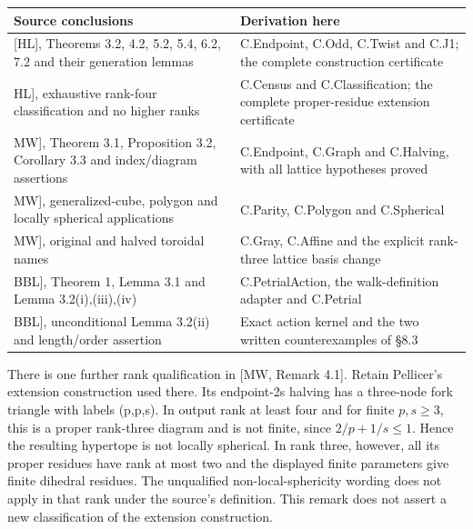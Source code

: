 \documentclass[
  11pt,
  a4paper,
]{article}
\newcounter{none} %
\begin{document}
{\def\LTcaptype{none} %
\begin{longtable}[]{@{}
  >{\raggedright\arraybackslash}p{}
  >{\raggedright\arraybackslash}p{}@{}}
\toprule\noalign{}
\begin{minipage}[b]{\linewidth}\raggedright
Source conclusions
\end{minipage} & \begin{minipage}[b]{\linewidth}\raggedright
Derivation here
\end{minipage} \\
\midrule\noalign{}
\endhead
\bottomrule\noalign{}
\endlastfoot
{[}HL{]}, Theorems 3.2, 4.2, 5.2, 5.4, 6.2, 7.2 and their generation
lemmas & C.Endpoint, C.Odd, C.Twist and C.J1; the complete construction
certificate \\
{[}HL{]}, exhaustive rank-four classification and no higher ranks &
C.Census and C.Classification; the complete proper-residue extension
certificate \\
{[}MW{]}, Theorem 3.1, Proposition 3.2, Corollary 3.3 and index/diagram
assertions & C.Endpoint, C.Graph and C.Halving, with all lattice
hypotheses proved \\
{[}MW{]}, generalized-cube, polygon and locally spherical applications &
C.Parity, C.Polygon and C.Spherical \\
{[}MW{]}, original and halved toroidal names & C.Gray, C.Affine and the
explicit rank-three lattice basis change \\
{[}BBL{]}, Theorem 1, Lemma 3.1 and Lemma 3.2(i),(iii),(iv) &
C.PetrialAction, the walk-definition adapter and C.Petrial \\
{[}BBL{]}, unconditional Lemma 3.2(ii) and length/order assertion &
Exact action kernel and the two written counterexamples of §8.3 \\
\end{longtable}
}

There is one further rank qualification in {[}MW, Remark 4.1{]}. Retain
Pellicer's extension construction used there. Its endpoint-2s halving
has a three-node fork triangle with labels (p,p,s). In output rank at
least four and for finite \(p,s\ge 3\), this is a proper rank-three
diagram and is not finite, since \(2/p+1/s\leq1\). Hence the resulting
hypertope is not locally spherical. In rank three, however, all its
proper residues have rank at most two and the displayed finite
parameters give finite dihedral residues. The unqualified
non-local-sphericity wording does not apply in that rank under the
source's definition. This remark does not assert a new classification of
the extension construction.
\end{document}
